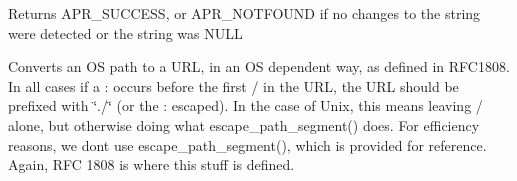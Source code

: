 \begin{DoxyReturn}{Returns}
A\+P\+R\+\_\+\+S\+U\+C\+C\+E\+SS, or A\+P\+R\+\_\+\+N\+O\+T\+F\+O\+U\+ND if no changes to the string were detected or the string was N\+U\+LL
\end{DoxyReturn}
Converts an OS path to a U\+RL, in an OS dependent way, as defined in R\+F\+C1808. In all cases if a \textquotesingle{}\+:\textquotesingle{} occurs before the first \textquotesingle{}/\textquotesingle{} in the U\+RL, the U\+RL should be prefixed with \char`\"{}./\char`\"{} (or the \textquotesingle{}\+:\textquotesingle{} escaped). In the case of Unix, this means leaving \textquotesingle{}/\textquotesingle{} alone, but otherwise doing what escape\+\_\+path\+\_\+segment() does. For efficiency reasons, we don\textquotesingle{}t use escape\+\_\+path\+\_\+segment(), which is provided for reference. Again, R\+FC 1808 is where this stuff is defined.

